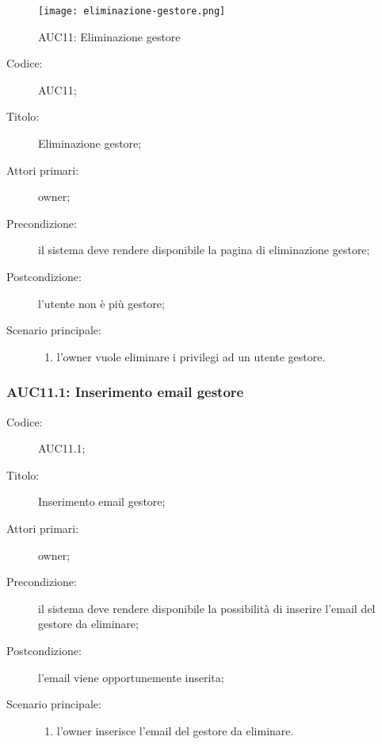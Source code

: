 \documentclass[../../../analisi-dei-requisiti.tex]{subfiles}
\begin{document}
\begin{figure}[H]
  \centering
  \texttt{[image: eliminazione-gestore.png]}
  \caption{AUC11: Eliminazione gestore}%
  \label{fig:AUC11}
\end{figure}

\begin{description}
  \item[Codice:] AUC11;
  \item[Titolo:] Eliminazione gestore;
  \item[Attori primari:] owner;
  \item[Precondizione:] il sistema deve rendere disponibile la pagina di eliminazione gestore;
  \item[Postcondizione:] l'utente non è più gestore;
  \item[Scenario principale:]
  \begin{enumerate}
    \item l'owner vuole eliminare i privilegi ad un utente gestore.
  \end{enumerate}
\end{description}

\subsubsection{AUC11.1: Inserimento email gestore}%
\label{subs:AUC11.1}
\begin{description}
  \item[Codice:] AUC11.1;
  \item[Titolo:] Inserimento email gestore;
  \item[Attori primari:] owner;
  \item[Precondizione:] il sistema deve rendere disponibile la possibilità di inserire l'email del gestore da eliminare;
  \item[Postcondizione:] l'email viene opportunemente inserita;
  \item[Scenario principale:]
  \begin{enumerate}
    \item l'owner inserisce l'email del gestore da eliminare.
  \end{enumerate}
\end{description}
\end{document}

